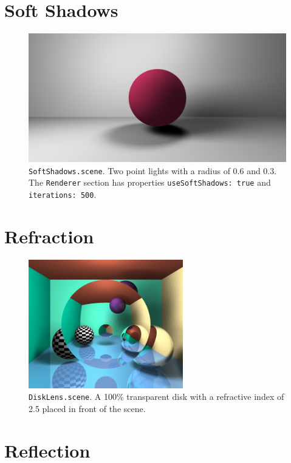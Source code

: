 \documentclass{article}
\begin{document}
\pagebreak

\section{Soft Shadows}

\begin{figure}[H]
    \centering
    \includegraphics[width=\textwidth]{./examples/SoftShadows.png}
    \caption{\texttt{SoftShadows.scene}. Two point lights with a radius of 0.6 and 0.3. The \texttt{Renderer} section has properties \texttt{useSoftShadows: true} and \texttt{iterations: 500}.}
\end{figure}

\section{Refraction}

\begin{figure}[H]
    \centering
    \includegraphics[width=0.6\textwidth]{./examples/DiskLens.png}
    \caption{\texttt{DiskLens.scene}. A 100\% transparent disk with a refractive index of 2.5 placed in front of the scene.}
\end{figure}

\section{Reflection}
\end{document}
